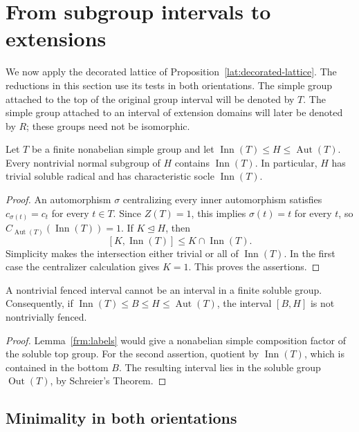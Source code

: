 \section{From subgroup intervals to extensions}
\label{ext:section}

We now apply the decorated lattice of Proposition~\ref{lat:decorated-lattice}.
The reductions in this section use its tests in both orientations.  The
simple group attached to the top of the original group interval will be
denoted by $T$.  The simple group attached to an interval of extension
domains will later be denoted by $R$; these groups need not be isomorphic.

\begin{lemma}\label{ext:almost-simple}
Let $T$ be a finite nonabelian simple group and let
$\operatorname{Inn}(T)\le H\le\operatorname{Aut}(T)$.
Every nontrivial normal subgroup of $H$ contains $\operatorname{Inn}(T)$.
In particular, $H$ has trivial soluble radical and has characteristic
socle $\operatorname{Inn}(T)$.
\end{lemma}
\begin{proof}
An automorphism $\sigma$ centralizing every inner automorphism satisfies
$c_{\sigma(t)}=c_t$ for every $t\in T$.  Since $Z(T)=1$, this implies
$\sigma(t)=t$ for every $t$, so
$C_{\operatorname{Aut}(T)}(\operatorname{Inn}(T))=1$.
If $K\trianglelefteq H$, then
\[
 [K,\operatorname{Inn}(T)]\le K\cap\operatorname{Inn}(T).
\]
Simplicity makes the intersection either trivial or all of
$\operatorname{Inn}(T)$.  In the first case the centralizer calculation
gives $K=1$.  This proves the assertions.
\end{proof}

\begin{lemma}\label{ext:soluble-interval}
A nontrivial fenced interval cannot be an interval in a finite soluble
group.  Consequently, if
$\operatorname{Inn}(T)\le B\le H\le\operatorname{Aut}(T)$, the interval
$[B,H]$ is not nontrivially fenced.
\end{lemma}
\begin{proof}
Lemma~\ref{frm:labels} would give a nonabelian simple composition factor
of the soluble top group.  For the second assertion, quotient by
$\operatorname{Inn}(T)$, which is contained in the bottom $B$.
The resulting interval lies in the soluble group
$\operatorname{Out}(T)$, by Schreier's Theorem.
\end{proof}

\subsection{Minimality in both orientations}

